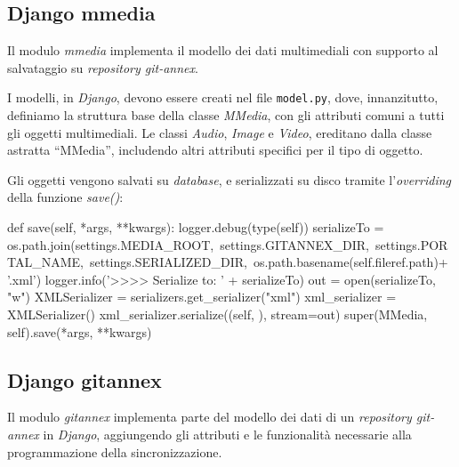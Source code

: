 \subsection{Django mmedia}

Il modulo \emph{mmedia} implementa il modello dei dati
multimediali con supporto al salvataggio su \emph{repository
  git-annex}.

I modelli, in \emph{Django}, devono essere creati nel file \verb|model.py|,
dove, innanzitutto, definiamo la struttura base della classe
\emph{MMedia}, con gli attributi comuni a tutti gli oggetti
multimediali. Le classi \emph{Audio}, \emph{Image} e \emph{Video},
ereditano dalla classe astratta ``MMedia'', includendo altri attributi
specifici per il tipo di oggetto.

Gli oggetti vengono salvati su \emph{database}, e serializzati su
disco tramite l'\emph{overriding} della funzione \emph{save()}:

\begin{code}
    def save(self, *args, **kwargs):
        logger.debug(type(self))
        serializeTo = os.path.join(settings.MEDIA_ROOT,\
                                   settings.GITANNEX_DIR,\
                                   settings.PORTAL_NAME,\
                                   settings.SERIALIZED_DIR,\
                                   os.path.basename(self.fileref.path)+ '.xml')
        logger.info('>>>> Serialize to: ' + serializeTo)
        out = open(serializeTo, "w")
        XMLSerializer = serializers.get_serializer("xml")
        xml_serializer = XMLSerializer()
        xml_serializer.serialize((self, ), stream=out)
        super(MMedia, self).save(*args, **kwargs)
\end{code}

\subsection{Django gitannex}

Il modulo \emph{gitannex} implementa parte del modello dei dati di un
\emph{repository git-annex} in \emph{Django}, aggiungendo gli attributi e le
funzionalità necessarie alla programmazione della sincronizzazione.

